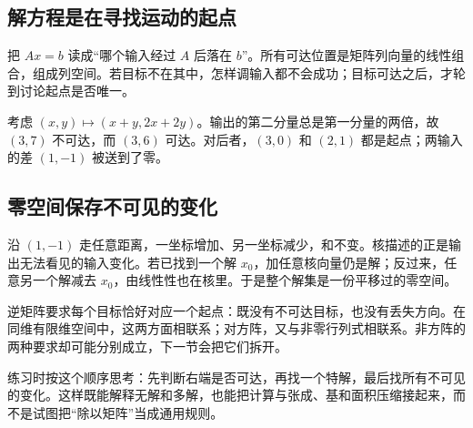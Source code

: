 \subsection*{解方程是在寻找运动的起点}
把 $Ax=b$ 读成“哪个输入经过 $A$ 后落在 $b$”。所有可达位置是矩阵列向量的线性组合，组成列空间。若目标不在其中，怎样调输入都不会成功；目标可达之后，才轮到讨论起点是否唯一。

考虑 $(x,y)\mapsto(x+y,2x+2y)$。输出的第二分量总是第一分量的两倍，故 $(3,7)$ 不可达，而 $(3,6)$ 可达。对后者，$(3,0)$ 和 $(2,1)$ 都是起点；两输入的差 $(1,-1)$ 被送到了零。

\subsection*{零空间保存不可见的变化}
沿 $(1,-1)$ 走任意距离，一坐标增加、另一坐标减少，和不变。核描述的正是输出无法看见的输入变化。若已找到一个解 $x_0$，加任意核向量仍是解；反过来，任意另一个解减去 $x_0$，由线性性也在核里。于是整个解集是一份平移过的零空间。

逆矩阵要求每个目标恰好对应一个起点：既没有不可达目标，也没有丢失方向。在同维有限维空间中，这两方面相联系；对方阵，又与非零行列式相联系。非方阵的两种要求却可能分别成立，下一节会把它们拆开。

练习时按这个顺序思考：先判断右端是否可达，再找一个特解，最后找所有不可见的变化。这样既能解释无解和多解，也能把计算与张成、基和面积压缩接起来，而不是试图把“除以矩阵”当成通用规则。
